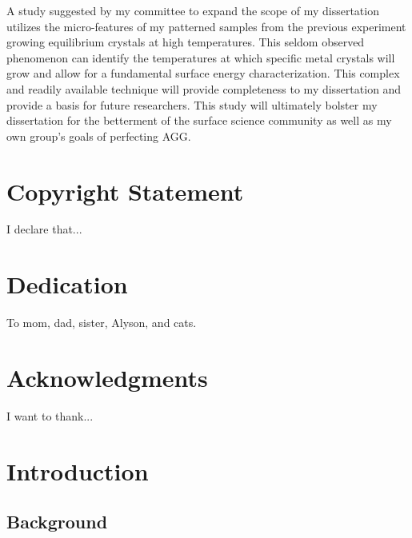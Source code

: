 \documentclass[12pt,letterpaper]{report}
\begin{document}
A study suggested by my committee to expand the scope of my dissertation utilizes the micro-features of my patterned samples from the previous experiment growing equilibrium crystals at high temperatures. This seldom observed phenomenon can identify the temperatures at which specific metal crystals will grow and allow for a fundamental surface energy characterization. This complex and readily available technique will provide completeness to my dissertation and provide a basis for future researchers. This study will ultimately bolster my dissertation for the betterment of the surface science community as well as my own group’s goals of perfecting AGG. 



\begin{titlepage}
	\clearpage 
	\maketitle
	
	\thispagestyle{empty}
\end{titlepage}
\chapter*{Copyright Statement}
I declare that...

\chapter*{Dedication}
To mom, dad, sister, Alyson, and cats.



\chapter*{Acknowledgments}
I want to thank...

\tableofcontents
\listoffigures
\listoftables

\chapter{Introduction}
\section{Background}\label{section1}
\end{document}
